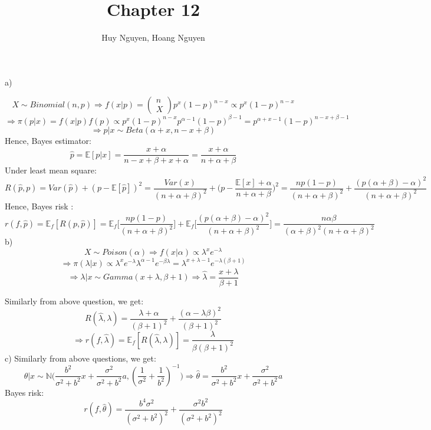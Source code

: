 \documentclass[10pt]{article}
\newenvironment{problem}[2][Problem]{\begin{trivlist}
\item[\hskip \labelsep {\bfseries #1}\hskip \labelsep {\bfseries #2.}]}{\end{trivlist}}
\begin{document}
\title{Chapter 12}
\author{Huy Nguyen, Hoang Nguyen}
\maketitle
    
\begin{problem}{1}

a) 

\[X \sim Binomial(n, p) \Rightarrow f(x|p)= \begin{pmatrix}
n\\
X
\end{pmatrix} p^x (1-p)^{n-x} \propto p^x(1-p)^{n-x} \] 
\[\Rightarrow \pi (p|x)= f(x|p)f(p) \propto p^x(1-p)^{n-x}p^{\alpha -1}(1-p)^{\beta -1} =p^{\alpha + x -1}(1-p)^{n-x+\beta -1}\]
\[\Rightarrow p|x \sim Beta(\alpha+x, n-x+\beta)\]
Hence, Bayes estimator:
\[\hat{p}= \mathbb{E}[p|x]= \frac{x+\alpha}{n-x+\beta + x+ \alpha}= \frac{x+\alpha}{n+\alpha +\beta}\]
Under least mean square:
\[R(\hat{p}, p)= Var(\hat{p})+ (p-\mathbb{E}[\hat{p}])^2=\frac{Var(x)}{(n+\alpha + \beta)^2}+ \big( p-\frac{\mathbb{E}[x]+\alpha}{n+ \alpha + \beta}\big)^2= \frac{np(1-p)}{(n+ \alpha + \beta)^2} + \frac{(p(\alpha + \beta)-\alpha)^2}{(n+ \alpha + \beta)^2}\]
Hence, Bayes risk :
\[r(f, \hat{p})= \mathbb{E}_f [R(p, \hat{p})]= \mathbb{E}_f \big [ \frac{np(1-p)}{(n+ \alpha + \beta)^2} \big] + \mathbb{E}_f \big [ \frac{(p(\alpha + \beta)-\alpha)^2}{(n+ \alpha + \beta)^2} \big ]=\frac{n\alpha \beta}{(\alpha + \beta)^2 (n+ \alpha + \beta)^2}\]
b) 
\[X \sim Poison(\alpha) \Rightarrow f(x|\alpha) \propto  \lambda ^x e^{-\lambda}\]
\[ \Rightarrow \pi (\lambda | x) \propto \lambda ^x e^{-\lambda} \lambda ^{\alpha -1} e^{-\beta \lambda}= \lambda ^{x+\lambda -1} e^ {-\lambda (\beta + 1)}\]
\[\Rightarrow \lambda|x \sim Gamma(x+\lambda, \beta + 1) \Rightarrow \hat{\lambda}=\frac{x+\lambda}{\beta + 1}\]

Similarly from above question, we get:
\[R(\hat{\lambda}, \lambda)=\frac{\lambda + \alpha}{(\beta +1)^2} +\frac{(\alpha -\lambda \beta)^2}{(\beta +1)^2}\]
\[\Rightarrow r(f, \hat{\lambda})= \mathbb{E}_f[R(\hat{\lambda}, \lambda)]= \frac{\lambda}{\beta (\beta +1)^2}\]
c) 
Similarly from above questions, we get:
\[\theta | x \sim \mathbb{N}\big( \frac{b^2}{\sigma ^2 + b^2}x+\frac{\sigma ^2}{\sigma ^2 + b^2}a,(\frac{1}{\sigma ^2}+ \frac{1}{b^2})^{-1}\big) \Rightarrow \hat{\theta}= \frac{b^2}{\sigma ^2 + b^2}x+\frac{\sigma ^2}{\sigma ^2 + b^2}a\]
Bayes risk:
\[r(f, \hat{\theta})= \frac{b^4 \sigma ^2}{(\sigma ^2 + b^2)^2}+ \frac{\sigma ^2 b^2}{(\sigma ^2 + b^2)^2}\]



\end{problem}
\end{document}
